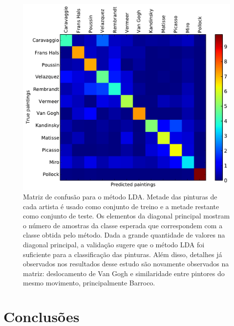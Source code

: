 \begin{figure}[h!]
\begin{center}
        \includegraphics[width=\columnwidth]{figs/matriz_confusao}
      \caption{Matriz de confusão para o método LDA. Metade das pinturas de cada
        artista é usado como conjunto de treino e a metade restante como
        conjunto de teste. Os elementos da diagonal principal mostram o número
        de amostras da classe esperada que correspondem com a classe obtida pelo
        método. Dada a grande quantidade de valores na diagonal principal, a
        validação sugere que o método LDA foi suficiente para a classificação
        das pinturas. Além disso, detalhes já observados nos resultados desse
        estudo são novamente observados na matriz: deslocamento de Van Gogh e
        similaridade entre pintores do mesmo movimento, principalmente Barroco.}
        \label{fig:cm}
\end{center}
\end{figure}



\chapter{Conclusões}
\label{chap:conclusoes}


